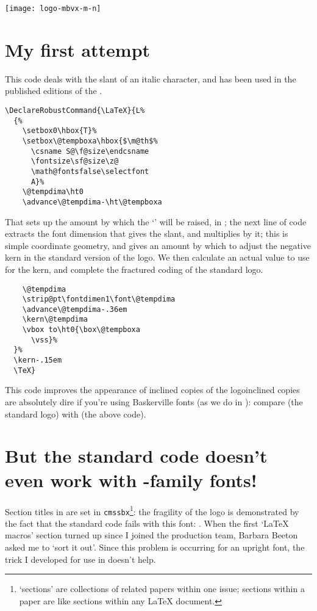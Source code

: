 \begin{Article}
  \begin{figure*}[tp]
    \begin{center}
      \leavevmode
      \texttt{[image: logo-mbvx-m-n]}
      \caption{\LaTeX{} logo samples for Baskerville medium, normal}
      \label{fig:bv-latex-sample}
    \end{center}
  \end{figure*}
  \section{My first attempt}

  This code deals with the slant of an italic character, and has been
  used in the published editions of the .
\begin{verbatim}
\DeclareRobustCommand{\LaTeX}{L%
  {%
    \setbox0\hbox{T}%
    \setbox\@tempboxa\hbox{$\m@th$%
      \csname S@\f@size\endcsname
      \fontsize\sf@size\z@
      \math@fontsfalse\selectfont
      A}%
    \@tempdima\ht0
    \advance\@tempdima-\ht\@tempboxa
\end{verbatim}
  That sets up the amount by which the `' will be raised,
  in ; the next line of code extracts the font dimension
  that gives the slant, and multiplies  by it; this is
  simple coordinate geometry, and gives an amount by which to adjust
  the negative kern in the standard version of the logo.  We then
  calculate an actual value to use for the kern, and complete the
  fractured coding of the standard logo.
\begin{verbatim}
    \@tempdima
    \strip@pt\fontdimen1\font\@tempdima
    \advance\@tempdima-.36em
    \kern\@tempdima
    \vbox to\ht0{\box\@tempboxa
      \vss}%
  }%
  \kern-.15em
  \TeX}
\end{verbatim}
  This code improves the appearance of inclined copies of the
  logo\Dash inclined copies are absolutely dire if you're using
  Baskerville fonts (as we do in \BV): compare \emph{\stdLaTeX} (the
  standard logo) with \emph{\faqLaTeX} (the above code).

  \section{But the standard code doesn't even work with
    -family fonts!}

  Section titles in \tub{} are set in \texttt{cmssbx}\footnote{\tub{}
    `sections' are collections of related papers within one issue;
    sections within a \tub{} paper are like sections within any
    \LaTeX{} document.}: the fragility of the logo is demonstrated by
  the fact that the standard code fails with this font:
  {\bfseries\selectfont\stdLaTeX}.  When the first
  `\LaTeX{} macros' section turned up since I joined the \tub{}
  production team, Barbara Beeton asked me to `sort it out'.  Since
  this problem is occurring for an upright font, the trick I developed
  for use in \BV{} doesn't help.


\end{Article}

